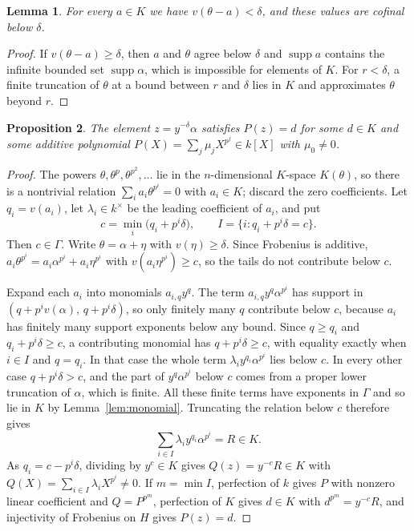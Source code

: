 \documentclass[11pt]{article}
\newtheorem{lemma}{Lemma}[section]
\newtheorem{proposition}[lemma]{Proposition}
\newcommand{\supp}{\operatorname{supp}}
\begin{document}
\begin{lemma}\label{lem:cut}
For every $a\in K$ we have $v(\theta-a)<\delta$, and these values are cofinal below $\delta$.
\end{lemma}

\begin{proof}
If $v(\theta-a)\ge\delta$, then $a$ and $\theta$ agree below $\delta$ and $\supp a$ contains the infinite bounded set $\supp\alpha$, which is impossible for elements of $K$. For $r<\delta$, a finite truncation of $\theta$ at a bound between $r$ and $\delta$ lies in $K$ and approximates $\theta$ beyond $r$.
\end{proof}

\begin{proposition}\label{prop:additive}
The element $z=y^{-\delta}\alpha$ satisfies $P(z)=d$ for some $d\in K$ and some additive polynomial $P(X)=\sum_j\mu_jX^{p^j}\in k[X]$ with $\mu_0\ne0$.
\end{proposition}

\begin{proof}
The powers $\theta,\theta^p,\theta^{p^2},\dots$ lie in the $n$-dimensional $K$-space $K(\theta)$, so there is a nontrivial relation $\sum_ia_i\theta^{p^i}=0$ with $a_i\in K$; discard the zero coefficients. Let $q_i=v(a_i)$, let $\lambda_i\in k^\times$ be the leading coefficient of $a_i$, and put
\[
c=\min_i\bigl(q_i+p^i\delta\bigr),\qquad I=\{i:q_i+p^i\delta=c\}.
\]
Then $c\in\Gamma$. Write $\theta=\alpha+\eta$ with $v(\eta)\ge\delta$. Since Frobenius is additive, $a_i\theta^{p^i}=a_i\alpha^{p^i}+a_i\eta^{p^i}$ with $v(a_i\eta^{p^i})\ge c$, so the tails do not contribute below $c$.

Expand each $a_i$ into monomials $a_{i,q}y^q$. The term $a_{i,q}y^q\alpha^{p^i}$ has support in $(q+p^iv(\alpha),\,q+p^i\delta)$, so only finitely many $q$ contribute below $c$, because $a_i$ has finitely many support exponents below any bound. Since $q\ge q_i$ and $q_i+p^i\delta\ge c$, a contributing monomial has $q+p^i\delta\ge c$, with equality exactly when $i\in I$ and $q=q_i$. In that case the whole term $\lambda_iy^{q_i}\alpha^{p^i}$ lies below $c$. In every other case $q+p^i\delta>c$, and the part of $y^q\alpha^{p^i}$ below $c$ comes from a proper lower truncation of $\alpha$, which is finite. All these finite terms have exponents in $\Gamma$ and so lie in $K$ by Lemma~\ref{lem:monomial}. Truncating the relation below $c$ therefore gives
\[
\sum_{i\in I}\lambda_iy^{q_i}\alpha^{p^i}=R\in K .
\]
As $q_i=c-p^i\delta$, dividing by $y^c\in K$ gives $Q(z)=y^{-c}R\in K$ with $Q(X)=\sum_{i\in I}\lambda_iX^{p^i}\ne0$. If $m=\min I$, perfection of $k$ gives $P$ with nonzero linear coefficient and $Q=P^{p^m}$, perfection of $K$ gives $d\in K$ with $d^{p^m}=y^{-c}R$, and injectivity of Frobenius on $H$ gives $P(z)=d$.
\end{proof}
\end{document}
